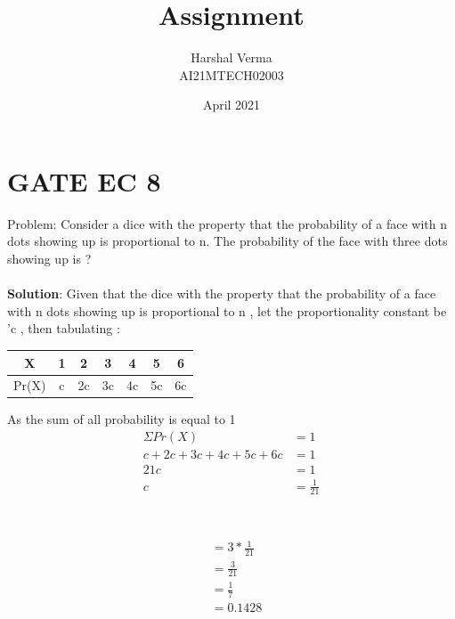 \documentclass[journal,12pt,twocolumn]{IEEEtran}
\title{Assignment  }
\author{Harshal Verma\\
AI21MTECH02003}
\date{April 2021}
\begin{document}
\maketitle
\section{GATE EC 8}
Problem: Consider a dice with the property that the probability of a face with n dots showing up is proportional to n. The probability of the face with three dots showing up is ?\\
\\
\textbf{Solution}: Given that the dice with the
 property that the probability of a face with n dots showing up is proportional to n , let the proportionality constant be 'c , then tabulating :
\\
\begin{center}
\begin{tabular}{ |c | c | c | c | c | c | c |}
\hline
X     & 1 & 2 & 3 & 4 & 5 & 6 \\
\hline
Pr(X) & c & 2c&3c &4c & 5c & 6c\\
\hline
\end{tabular}
\end{center}
\smallskip
As the sum of all probability is equal to 1\\
\begin{align*}
\Sigma Pr(X) &= 1\\
c + 2c + 3c + 4c + 5c + 6c &= 1\\
21c &= 1\\
c &= \frac{1}{21}\\
\end{align*}
\smallskip
{} \\
\\
\begin{align*}
&= 3*\frac{1}{21}\\
&= \frac{3}{21}\\
&= \frac{1}{7}\\
&= 0.1428   
\end{align*}
\samllskip
\end{document}
